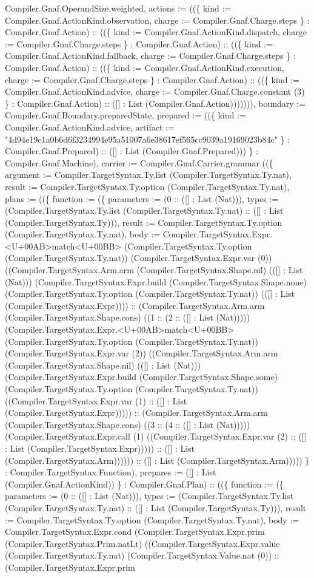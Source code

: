 \documentclass[11pt]{article}
\begin{document}
Compiler.Gnaf.OperandSize.weighted, actions := ((\{ kind := Compiler.Gnaf.ActionKind.observation, charge := Compiler.Gnaf.Charge.steps \} : Compiler.Gnaf.Action) :: ((\{ kind := Compiler.Gnaf.ActionKind.dispatch, charge := Compiler.Gnaf.Charge.steps \} : Compiler.Gnaf.Action) :: ((\{ kind := Compiler.Gnaf.ActionKind.fallback, charge := Compiler.Gnaf.Charge.steps \} : Compiler.Gnaf.Action) :: ((\{ kind := Compiler.Gnaf.ActionKind.execution, charge := Compiler.Gnaf.Charge.steps \} : Compiler.Gnaf.Action) :: ((\{ kind := Compiler.Gnaf.ActionKind.advice, charge := Compiler.Gnaf.Charge.constant (3) \} : Compiler.Gnaf.Action) :: ([] : List (Compiler.Gnaf.Action))))))), boundary := Compiler.Gnaf.Boundary.preparedState, prepared := ((\{ kind := Compiler.Gnaf.ActionKind.advice, artifact := "4d94e19c1a0b6d6f3234994e95a51007a6e38617ef565cc9039a19169023b84c" \} : Compiler.Gnaf.Prepared) :: ([] : List (Compiler.Gnaf.Prepared))) \} : Compiler.Gnaf.Machine), carrier := Compiler.Gnaf.Carrier.grammar ((\{ argument := Compiler.TargetSyntax.Ty.list (Compiler.TargetSyntax.Ty.nat), result := Compiler.TargetSyntax.Ty.option (Compiler.TargetSyntax.Ty.nat), plans := ((\{ function := (\{ parameters := (0 :: ([] : List (Nat))), types := (Compiler.TargetSyntax.Ty.list (Compiler.TargetSyntax.Ty.nat) :: ([] : List (Compiler.TargetSyntax.Ty))), result := Compiler.TargetSyntax.Ty.option (Compiler.TargetSyntax.Ty.nat), body := Compiler.TargetSyntax.Expr.<U+00AB>match<U+00BB> (Compiler.TargetSyntax.Ty.option (Compiler.TargetSyntax.Ty.nat)) (Compiler.TargetSyntax.Expr.var (0)) ((Compiler.TargetSyntax.Arm.arm (Compiler.TargetSyntax.Shape.nil) (([] : List (Nat))) (Compiler.TargetSyntax.Expr.build (Compiler.TargetSyntax.Shape.none) (Compiler.TargetSyntax.Ty.option (Compiler.TargetSyntax.Ty.nat)) (([] : List (Compiler.TargetSyntax.Expr)))) :: (Compiler.TargetSyntax.Arm.arm (Compiler.TargetSyntax.Shape.cons) ((1 :: (2 :: ([] : List (Nat))))) (Compiler.TargetSyntax.Expr.<U+00AB>match<U+00BB> (Compiler.TargetSyntax.Ty.option (Compiler.TargetSyntax.Ty.nat)) (Compiler.TargetSyntax.Expr.var (2)) ((Compiler.TargetSyntax.Arm.arm (Compiler.TargetSyntax.Shape.nil) (([] : List (Nat))) (Compiler.TargetSyntax.Expr.build (Compiler.TargetSyntax.Shape.some) (Compiler.TargetSyntax.Ty.option (Compiler.TargetSyntax.Ty.nat)) ((Compiler.TargetSyntax.Expr.var (1) :: ([] : List (Compiler.TargetSyntax.Expr))))) :: (Compiler.TargetSyntax.Arm.arm (Compiler.TargetSyntax.Shape.cons) ((3 :: (4 :: ([] : List (Nat))))) (Compiler.TargetSyntax.Expr.call (1) ((Compiler.TargetSyntax.Expr.var (2) :: ([] : List (Compiler.TargetSyntax.Expr))))) :: ([] : List (Compiler.TargetSyntax.Arm)))))) :: ([] : List (Compiler.TargetSyntax.Arm))))) \} : Compiler.TargetSyntax.Function), prepares := ([] : List (Compiler.Gnaf.ActionKind)) \} : Compiler.Gnaf.Plan) :: ((\{ function := (\{ parameters := (0 :: ([] : List (Nat))), types := (Compiler.TargetSyntax.Ty.list (Compiler.TargetSyntax.Ty.nat) :: ([] : List (Compiler.TargetSyntax.Ty))), result := Compiler.TargetSyntax.Ty.option (Compiler.TargetSyntax.Ty.nat), body := Compiler.TargetSyntax.Expr.cond (Compiler.TargetSyntax.Expr.prim (Compiler.TargetSyntax.Prim.natLt) ((Compiler.TargetSyntax.Expr.value (Compiler.TargetSyntax.Ty.nat) (Compiler.TargetSyntax.Value.nat (0)) :: (Compiler.TargetSyntax.Expr.prim 
\end{document}
